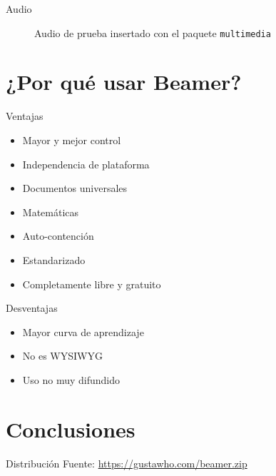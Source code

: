\documentclass[10pt]{beamer}
\begin{document}
\begin{frame}{Audio}
\begin{figure}[h!]
\centering    
{}
  \caption{Audio de prueba insertado con el paquete \texttt{multimedia}}
 \end{figure}
\end{frame}

\section{¿Por qué usar Beamer?}
\begin{frame}{Ventajas}
    \begin{itemize}
        \item Mayor y mejor control
        \item Independencia de plataforma
        \item Documentos universales
        \item Matemáticas
        \item Auto-contención
        \item Estandarizado
        \item Completamente libre y gratuito
    \end{itemize}
\end{frame}

\begin{frame}{Desventajas}
    \begin{itemize}
        \item Mayor curva de aprendizaje
        \item No es WYSIWYG
        \item Uso no muy difundido
    \end{itemize}
\end{frame}

\section{Conclusiones}
\begin{frame}{Distribución}
    \doclicenseThis
    Fuente: \url{https://gustawho.com/beamer.zip}
\end{frame}
\end{document}
